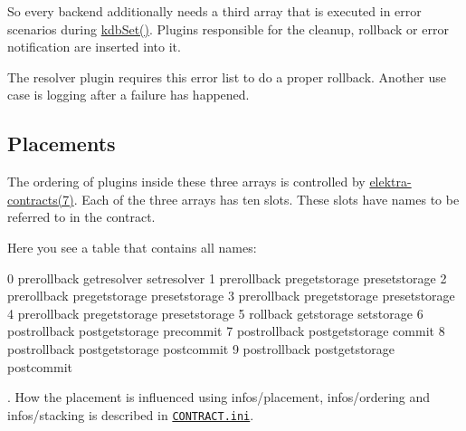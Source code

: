 So every backend additionally needs a third array that is executed in error scenarios during {\ttfamily \hyperlink{group__kdb_ga11436b058408f83d303ca5e996832bcf}{kdb\+Set()}}. Plugins responsible for the cleanup, rollback or error notification are inserted into it.

The resolver plugin requires this error list to do a proper rollback. Another use case is logging after a failure has happened.

\subsection*{Placements}

The ordering of plugins inside these three arrays is controlled by \hyperlink{md_doc_help_elektra-contracts_doc_help_elektra-contracts_md}{elektra-\/contracts(7)}. Each of the three arrays has ten slots. These slots have names to be referred to in the contract.

Here you see a table that contains all names\+: \begin{DoxyVerb}    0     prerollback       getresolver         setresolver
    1     prerollback       pregetstorage      presetstorage
    2     prerollback       pregetstorage      presetstorage
    3     prerollback       pregetstorage      presetstorage
    4     prerollback       pregetstorage      presetstorage
    5      rollback            getstorage         setstorage
    6    postrollback      postgetstorage      precommit
    7    postrollback      postgetstorage         commit
    8    postrollback      postgetstorage     postcommit
    9    postrollback      postgetstorage     postcommit
\end{DoxyVerb}


. How the placement is influenced using {\ttfamily infos/placement}, {\ttfamily infos/ordering} and {\ttfamily infos/stacking} is described in \href{/home/markus/Projekte/Elektra/current/doc/CONTRACT.ini}{\tt C\+O\+N\+T\+R\+A\+C\+T.\+ini}. 